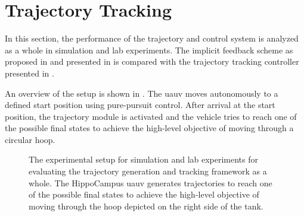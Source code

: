 


\section{Trajectory Tracking}

In this section, the performance of the trajectory and control system is analyzed as a whole in simulation and lab experiments.
The implicit feedback scheme as proposed in \cite{MuellerHehn15} and presented in  is compared with the trajectory tracking controller presented in .

An overview of the setup is shown in .
The \ac{uauv} moves autonomously to a defined start position using pure-pursuit control.
After arrival at the start position, the trajectory module is activated and the vehicle tries to reach one of the possible final states to achieve the high-level objective of moving through a circular hoop.
\begin{figure}
    \centering
    
    \caption{The experimental setup for simulation and lab experiments for evaluating the trajectory generation and tracking framework as a whole. The HippoCampus \ac{uauv} generates trajectories to reach one of the possible final states to achieve the high-level objective of moving through the hoop depicted on the right side of the tank.}
    \label{fig:experimental_setup_drawing}
\end{figure}

